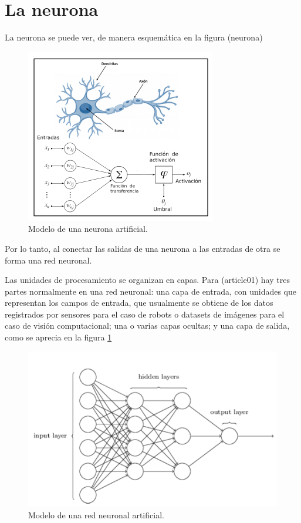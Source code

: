 \documentclass{article}
\begin{document}
  \section{La neurona}

  La neurona se puede ver, de manera esquemática en la figura (neurona)

  \begin{figure}[ht!]
    \centering
    \includegraphics[width=0.6\linewidth]{neurona}
    \caption{Modelo de una neurona artificial.}
  \end{figure}

  Por lo tanto, al conectar las salidas de una neurona a las entradas de otra se
  forma una red neuronal.

  Las unidades de procesamiento se organizan en capas. Para (article01) hay
  tres partes normalmente en una red neuronal: una capa de entrada, con unidades
  que representan los campos de entrada, que usualmente se obtiene de los datos
  registrados por sensores para el caso de robots o datasets de imágenes para el
  caso de visión computacional; una o varias capas ocultas; y una capa de
  salida, como se aprecia en la figura \ref{fig:red-neuronal}

  \begin{figure}[ht!]
    \centering
    \includegraphics[width=0.8\linewidth]{red-neuronal}
    \caption{Modelo de una red neuronal artificial.}
    \label{fig:red-neuronal}
  \end{figure}
\end{document}
